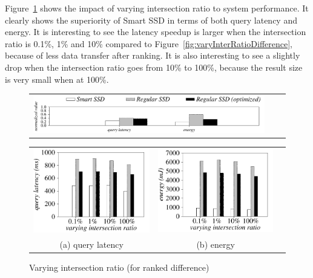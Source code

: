 
Figure~\ref{fig:varyInterRatioRankDifference} shows the impact of varying intersection ratio to system performance.
It clearly shows the superiority of Smart SSD in terms of both query latency and energy.
It is interesting to see the latency speedup is larger when the intersection ratio is 0.1\%, 1\% and 10\% compared to Figure~\ref{fig:varyInterRatioDifference}, because of less data transfer after ranking. It is also interesting to see a slightly drop when the intersection ratio goes from 10\% to 100\%, because the result size is very small when at 100\%.

 \begin{figure}[tbp]
\centering
\begin{tabular}{ccc}
\includegraphics[width=0.95\columnwidth]{figures/banner.pdf}
\end{tabular}
\renewcommand{\tabcolsep}{0.1mm}
\begin{tabular}{ccc}
\includegraphics[width=0.5\columnwidth]{figures/RankDifference-time-VaryInterRatio-equal-eps-converted-to.pdf}&
\includegraphics[width=0.5\columnwidth]{figures/RankDifference-energy-VaryInterRatio-equal-eps-converted-to.pdf}\\
(a) query latency & (b) energy
\end{tabular}
\caption{Varying intersection ratio (for ranked difference)}
\label{fig:varyInterRatioRankDifference}
\end{figure}


